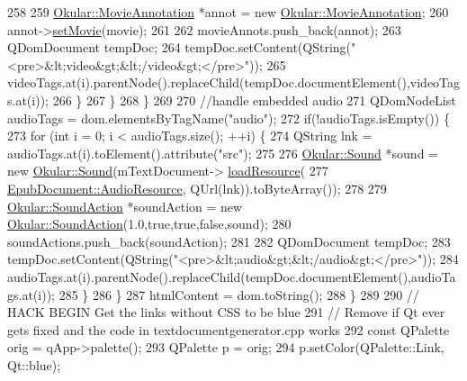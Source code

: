 \begin{DoxyCode}
{258 
259               \hyperlink{classOkular_1_1MovieAnnotation}{Okular::MovieAnnotation} *annot = \textcolor{keyword}{new} 
      \hyperlink{classOkular_1_1MovieAnnotation}{Okular::MovieAnnotation};
260               annot->\hyperlink{classOkular_1_1MovieAnnotation_a76ea2ec20c8d441f1b9e2ce6f1eaf21f}{setMovie}(movie);
261 
262               movieAnnots.push\_back(annot);
263               QDomDocument tempDoc;
264               tempDoc.setContent(QString(\textcolor{stringliteral}{"<pre>&lt;video&gt;&lt;/video&gt;</pre>"}));
265               videoTags.at(i).parentNode().replaceChild(tempDoc.documentElement(),videoTags.at(i));
266             \}
267           \}
268         \}
269 
270         \textcolor{comment}{//handle embedded audio}
271         QDomNodeList audioTags = dom.elementsByTagName(\textcolor{stringliteral}{"audio"});
272         \textcolor{keywordflow}{if}(!audioTags.isEmpty()) \{
273           \textcolor{keywordflow}{for} (\textcolor{keywordtype}{int} i = 0; i < audioTags.size(); ++i) \{
274             QString lnk = audioTags.at(i).toElement().attribute(\textcolor{stringliteral}{"src"});
275 
276             \hyperlink{classOkular_1_1Sound}{Okular::Sound} *sound = \textcolor{keyword}{new} \hyperlink{classOkular_1_1Sound}{Okular::Sound}(mTextDocument->
      \hyperlink{classEpub_1_1EpubDocument_a5977d43df31dc940280f6fc80eb6bc75}{loadResource}(
277                     \hyperlink{classEpub_1_1EpubDocument_a8727955892e8fa3c5eaef8d9d3ae7c8fa858f54dd2eb2907bbf1be8fbe0d1c054}{EpubDocument::AudioResource}, QUrl(lnk)).toByteArray());
278 
279             \hyperlink{classOkular_1_1SoundAction}{Okular::SoundAction} *soundAction = \textcolor{keyword}{new} 
      \hyperlink{classOkular_1_1SoundAction}{Okular::SoundAction}(1.0,\textcolor{keyword}{true},\textcolor{keyword}{true},\textcolor{keyword}{false},sound);
280             soundActions.push\_back(soundAction);
281 
282             QDomDocument tempDoc;
283             tempDoc.setContent(QString(\textcolor{stringliteral}{"<pre>&lt;audio&gt;&lt;/audio&gt;</pre>"}));
284             audioTags.at(i).parentNode().replaceChild(tempDoc.documentElement(),audioTags.at(i));
285           \}
286         \}
287         htmlContent = dom.toString();
288       \}
289 
290       \textcolor{comment}{// HACK BEGIN Get the links without CSS to be blue}
291       \textcolor{comment}{//            Remove if Qt ever gets fixed and the code in textdocumentgenerator.cpp works}
292       \textcolor{keyword}{const} QPalette orig = qApp->palette();
293       QPalette p = orig;
294       p.setColor(QPalette::Link, Qt::blue);
}
\end{DoxyCode}
